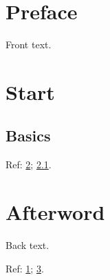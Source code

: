\documentclass{book}
\begin{document}
\frontmatter
\chapter{Preface}\label{preface}
Front text.
\tableofcontents
\mainmatter
\chapter{Start}\label{start}
\section{Basics}\label{basics}
Ref: \ref{start}; \ref{basics}.
\backmatter
\chapter{Afterword}\label{afterword}
Back text.

Ref: \ref{preface}; \ref{afterword}.
\end{document}
